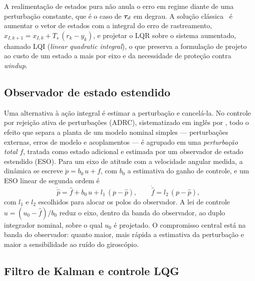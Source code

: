A realimentação de estados pura não anula o erro em regime diante de uma
perturbação constante, que é o caso de $\bm{\tau}_d$ em degrau. A solução
clássica~\cite{young1972} é aumentar o vetor de estados com a integral do erro de
rastreamento, $x_{I,k+1} = x_{I,k} + T_s\,(r_k - y_k)$, e projetar o LQR sobre
o sistema aumentado, chamado LQI (\textit{linear quadratic integral}), o que
preserva a formulação de projeto ao custo de um
estado a mais por eixo e da necessidade de proteção contra \textit{windup}.

\subsection{Observador de estado estendido}

Uma alternativa à ação integral é estimar a perturbação e cancelá-la. No
controle por rejeição ativa de perturbações (ADRC), sistematizado em inglês
por , todo o efeito que separa a planta de um modelo nominal
simples --- perturbações externas, erros de modelo e acoplamentos --- é
agrupado em uma \emph{perturbação total} $f$, tratada como estado adicional e
estimada por um observador de estado estendido (ESO). Para um eixo de atitude
com a velocidade angular medida, a dinâmica se escreve
$\dot p = b_0\,u + f$, com $b_0$ a estimativa do ganho de controle, e um ESO
linear de segunda ordem é~\cite{gao2003}
\begin{equation}
\dot{\hat p} = \hat f + b_0\,u + l_1\,(p - \hat p), \qquad
\dot{\hat f} = l_2\,(p - \hat p),
\label{eq:eso}
\end{equation}
com $l_1$ e $l_2$ escolhidos para alocar os polos do observador. A lei de
controle $u = (u_0 - \hat f)/b_0$ reduz o eixo, dentro da banda do observador,
ao duplo integrador nominal, sobre o qual $u_0$ é projetado. O compromisso
central está na banda do observador: quanto maior, mais rápida a estimativa da
perturbação e maior a sensibilidade ao ruído do giroscópio.

\subsection{Filtro de Kalman e controle LQG}
\label{sec:lqg}

